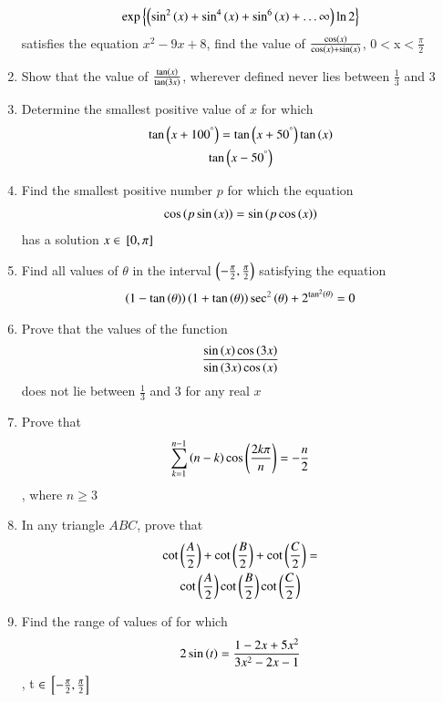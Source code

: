 \documentclass[journal,12pt,article,twocolumn]{IEEEtran}
\theoremstyle{remark}
\begin{document}
\begin{enumerate}
\begin{align*}
\exp \left\{\left(\sin^2\left(x\right)+\sin^4\left(x\right)+\sin^6\left(x\right)+\dots\infty\right)\ln 2\right\}
\end{align*}
satisfies the equation $x^2-9x+8$, find the value of $\frac{\cos \left(x\right)}{\cos \left(x\right) + \sin \left(x\right)}$, 0$<$x$<$$\frac{\pi}{2}$
\hfill{}
\item Show that the value of  $\frac{\tan \left(x\right)}{\tan \left(3x\right)}$, wherever defined never lies between $\frac{1}{3}$ and 3
\hfill{}
\item Determine the smallest positive value of $x$  for which 
\begin{multline*}
\tan {\ensuremath{\left(x+100^{\degree}\right)}}=\tan {\ensuremath{\left(x+50^{\degree}\right)}}\tan \left(x\right)\\\tan {\ensuremath{\left(x-50^{\degree}\right)}}
\end{multline*}
\hfill{}
\item Find the smallest positive number $p$ for which the equation 
\begin{align*}
\cos {\ensuremath{\left(p\sin \left(x\right)\right)}}=\sin {\ensuremath{\left(p\cos \left(x\right)\right)}}
\end{align*}
has a solution $ x \in {}\left[0, \pi\right]$
\hfill{}
\item Find all values of $\theta$ in the interval $\left(-\frac{\pi}{2},\frac{\pi}{2}\right)$ satisfying the equation 
\begin{align*}
\left(1-\tan \left(\theta\right)\right)\left(1+\tan \left(\theta\right)\right)\sec^2\left(\theta\right)+ 2^{\tan^2\left(\theta\right)}=0
\end{align*}
\hfill{}
\item Prove that the values of the function 
\begin{align*}
\frac{\sin \left(x\right) \cos \left(3x\right)}{\sin \left(3x\right) \cos \left(x\right)}
\end{align*}
does not lie between $\frac{1}{3}$ and 3 for any real $x$\\
\hfill{}
\item Prove that 
\begin{align*}
\sum_{k=1}^{n-1} \left(n-k\right)\cos\left( \frac{2k\pi}{n}\right)=-\frac{n}{2}
\end{align*}
, where $n\ge3$
\hfill{}
\item In any triangle $ABC$, prove that 
\begin{multline*}
\cot \left(\frac{A}{2}\right)+\cot \left(\frac{B}{2}\right)+\cot \left(\frac{C}{2}\right)=\\\cot \left(\frac{A}{2}\right)\cot \left(\frac{B}{2}\right)\cot \left(\frac{C}{2}\right)
\end{multline*}
\hfill{}
\item Find the range of values of for which 
\begin{align*}
2\sin \left(t\right) = \frac{1-2x+5x^2}{3x^2-2x-1}
\end{align*}
, t $\in {}\left[-\frac{\pi}{2},\frac{\pi}{2}\right]$
\hfill{}
\end{enumerate}
\end{document}
